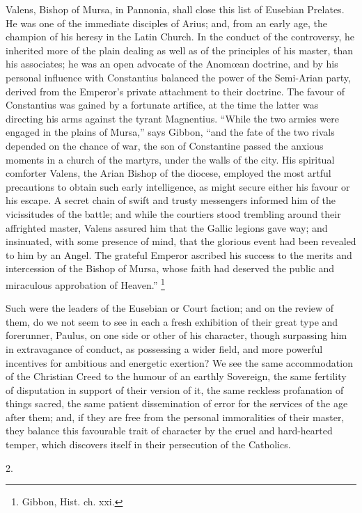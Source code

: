 Valens, Bishop of Mursa, in Pannonia, shall close this list of
Eusebian Prelates. He was one of the immediate disciples of Arius;
and, from an early age, the champion of his heresy in the Latin
Church. In the conduct of the controversy, he inherited more of the
plain dealing as well as of the principles of his master, than his
associates; he was an open advocate of the Anomœan doctrine, and by
his personal influence with Constantius balanced the power of the
Semi-Arian party, derived from the Emperor's private attachment to
their doctrine. The favour of Constantius was gained by a fortunate
artifice, at the time the latter was directing his arms against the
tyrant Magnentius. ``While the two armies were engaged in the
plains of Mursa,'' says Gibbon, ``and the fate of the two
rivals depended on the chance of war, the son of Constantine passed
the anxious moments in a church of the martyrs, under the walls of the
city. His spiritual comforter Valens, the Arian Bishop of the diocese,
employed the most artful precautions to obtain such early
intelligence, as might secure either his favour or his escape. A
secret chain of swift and trusty messengers informed him of the
vicissitudes of the battle; and while the courtiers stood trembling
around their affrighted master, Valens assured him that the
Gallic legions gave way; and insinuated, with some presence of mind,
that the glorious event had been revealed to him by an Angel. The
grateful Emperor ascribed his success to the merits and intercession
of the Bishop of Mursa, whose faith had deserved the public and
miraculous approbation of Heaven.'' \footnote{Gibbon, Hist. ch. xxi.}

Such were the leaders of the Eusebian or Court faction; and on the
review of them, do we not seem to see in each a fresh exhibition of
their great type and forerunner, Paulus, on one side or other of his
character, though surpassing him in extravagance of conduct, as
possessing a wider field, and more powerful incentives for ambitious
and energetic exertion? We see the same accommodation of the Christian
Creed to the humour of an earthly Sovereign, the same fertility of
disputation in support of their version of it, the same reckless
profanation of things sacred, the same patient dissemination of error
for the services of the age after them; and, if they are free from the
personal immoralities of their master, they balance this favourable
trait of character by the cruel and hard-hearted temper, which
discovers itself in their persecution of the Catholics.

2.

